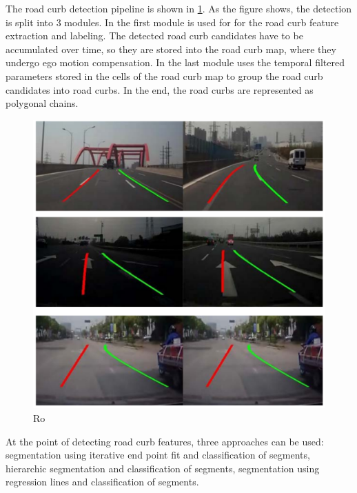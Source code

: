 \documentclass[conference]{IEEEtran}
\begin{document}
The road curb detection pipeline is shown in \ref{fig1}. As the figure shows, the detection is split into 3 modules. In the first module is used for for the road curb feature extraction and labeling. The detected road curb candidates have to be accumulated over time, so they are stored into the road curb map, where they undergo ego motion compensation. In the last module uses the temporal filtered parameters stored in the cells of the road curb map to group the road curb candidates into road curbs. In the end, the road curbs are represented as polygonal chains.  

\begin{figure}[ht]
	\centering
  \includegraphics[scale = 0.5]{pictures/lidar_system.pdf}
	\caption{Ro}
	\label{fig1}
\end{figure}
  
At the point of detecting road curb features, three approaches can be used: segmentation using iterative end point fit and classification of segments, hierarchic segmentation and classification of segments, segmentation using regression lines and classification of segments.
\end{document}
